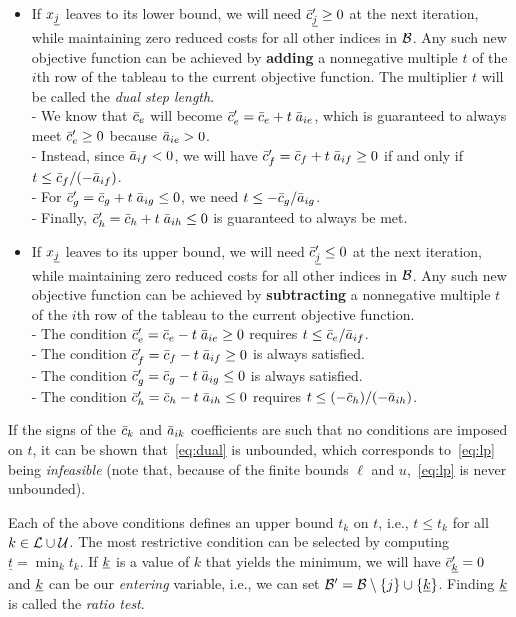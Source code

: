 \begin{itemize}
\item If $x_{\underline{j}}$ leaves to its lower bound, we will need $\bar c_{\underline{j}}' \geq 0$
	at the next iteration, while maintaining zero reduced costs
	for all other indices in $\mathcal{B}$.
	Any such new objective function
	can be achieved by \textbf{adding}
	a nonnegative multiple $t$ of the $i$th
	row of the tableau to the current objective function.
	The multiplier $t$ will be called the \emph{dual step length}. \\
	- We know that $\bar c_e$ will become $\bar c_e' = \bar c_e + t \; \bar a_{ie}$,
	which is guaranteed to always
	meet $\bar c_e' \geq 0$ because $\bar a_{ie} > 0$. \\
	- Instead, since $\bar a_{if} < 0$,
	we will have $\bar c_f' = \bar c_f + t \; \bar a_{if} \geq 0$
	if and only if $t \leq \bar c_f / (-\bar a_{if})$. \\
	- For $\bar c_g' = \bar c_g + t \; \bar a_{ig} \leq 0$, we need
	$t \leq -\bar c_g / \bar a_{ig}$. \\
	- Finally, $\bar c_h' = \bar c_h + t \; \bar a_{ih} \leq 0$ is guaranteed
	to always be met.
\item If $x_{\underline{j}}$ leaves to its upper bound, we will need $\bar c_{\underline{j}}' \leq 0$
	at the next iteration, while maintaining zero reduced costs
	for all other indices in $\mathcal{B}$.
	Any such new objective function
	can be achieved by \textbf{subtracting}
	a nonnegative multiple $t$ of the $i$th
	row of the tableau to the current objective function. \\
	- The condition $\bar c_e' = \bar c_e - t \; \bar a_{ie} \geq 0$
	requires $t \leq \bar c_e / \bar a_{if}$. \\
	- The condition $\bar c_f' = \bar c_f - t \; \bar a_{if} \geq 0$
	is always satisfied. \\
	- The condition $\bar c_g' = \bar c_g - t \; \bar a_{ig} \leq 0$
	is always satisfied. \\
	- The condition $\bar c_h' = \bar c_h - t \; \bar a_{ih} \leq 0$
	requires $t \leq (-\bar c_h) / (-\bar a_{ih})$.
\end{itemize}

If the signs of the $\bar c_k$ and $\bar a_{ik}$ coefficients are such that
no conditions are imposed on $t$, it can be shown that~\eqref{eq:dual}
is unbounded, which corresponds to~\eqref{eq:lp} being \emph{infeasible}
(note that, because of the finite bounds $\ell$ and $u$,~\eqref{eq:lp}
is never unbounded).

Each of the above conditions defines an upper bound $t_k$ on $t$,
i.e., $t \leq t_k$ for all $k \in \mathcal{L} \cup \mathcal{U}$.
The most restrictive condition
can be selected by computing $\underline{t} = \min_k t_k$.
If $\underline{k}$ is
a value of $k$ that yields the minimum, we will have
$\bar c_{\underline{k}}' = 0$ and $\underline{k}$ can be our
\emph{entering} variable, i.e., we can set
$\mathcal{B}' = \mathcal{B} \setminus \{ j \} \cup \{ \underline{k} \}$.
Finding $\underline{k}$ is called the \emph{ratio test}.

